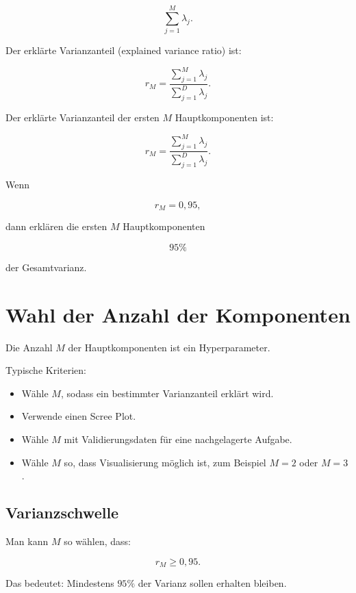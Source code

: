 \[
    \sum_{j=1}^{M}
    \lambda_j.
\]

Der erklärte Varianzanteil (explained variance ratio) ist:

\[
    r_M
    =
    \frac{
        \sum_{j=1}^{M}
        \lambda_j
    }{
        \sum_{j=1}^{D}
        \lambda_j
    }.
\]

\begin{definitionbox}
Der erklärte Varianzanteil der ersten \(M\) Hauptkomponenten ist:

\[
    r_M
    =
    \frac{
        \sum_{j=1}^{M}
        \lambda_j
    }{
        \sum_{j=1}^{D}
        \lambda_j
    }.
\]
\end{definitionbox}

\begin{examplebox}
Wenn

\[
    r_M=0{,}95,
\]

dann erklären die ersten \(M\) Hauptkomponenten

\[
    95\%
\]

der Gesamtvarianz.
\end{examplebox}

\section{Wahl der Anzahl der Komponenten}

Die Anzahl \(M\) der Hauptkomponenten ist ein Hyperparameter.

Typische Kriterien:

\begin{itemize}
    \item Wähle \(M\), sodass ein bestimmter Varianzanteil erklärt wird.
    \item Verwende einen Scree Plot.
    \item Wähle \(M\) mit Validierungsdaten für eine nachgelagerte Aufgabe.
    \item Wähle \(M\) so, dass Visualisierung möglich ist, zum Beispiel \(M=2\) oder \(M=3\).
\end{itemize}

\subsection{Varianzschwelle}

Man kann \(M\) so wählen, dass:

\[
    r_M \geq 0{,}95.
\]

Das bedeutet:
Mindestens \(95\%\) der Varianz sollen erhalten bleiben.

